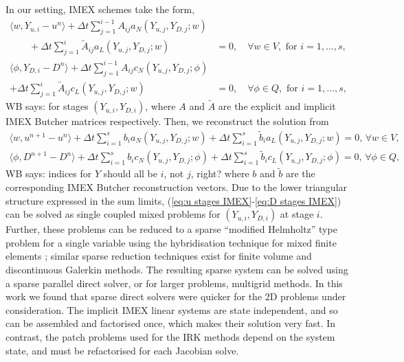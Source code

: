 \documentclass[a4paper, 12pt]{article}
\newcommand{\werner}[1]{{\color{magenta}WB says: #1}}
\begin{document}
In our setting, IMEX schemes take the form,
\begin{align}
    \nonumber
    \langle w, Y_{u,i}-u^n \rangle + \Delta t \sum_{j=1}^{i-1} A_{ij} a_N\left(
    Y_{u,j}, Y_{D,j}; w\right) & \\
\qquad    + \Delta t \sum_{j=1}^i \tilde{A}_{ij} a_L(Y_{u,j}, Y_{D,j}; w)
    & = 0, \label{eq:u stages IMEX}
  \quad \forall w \in V,\mbox{ for }i=1,\ldots,s, \\
  \nonumber
    \langle \phi, Y_{D,i}-D^n \rangle + \Delta t \sum_{j=1}^{i-1} A_{ij} c_N\left(
    Y_{u,j}, Y_{D,j}; \phi\right) & \\
    + \Delta t \sum_{j=1}^i \tilde{A}_{ij} c_L(Y_{u,j}, Y_{D,j}; w)
    & = 0, \label{eq:D stages IMEX}
      \quad \forall \phi \in Q,\mbox{ for }i=1,\ldots,s,
\end{align}
\werner{for stages $(Y_{u,i},Y_{D,i})$,}
where $A$ and $\tilde{A}$ are the explicit and implicit IMEX Butcher
matrices respectively. Then, we reconstruct the solution from
\begin{align}
  \langle w, u^{n+1} - u^n\rangle + \Delta t\sum_{i=1}^s b_i
  a_N(Y_{u,j}, Y_{D,j}; w)
  + \Delta t \sum_{i=1}^s \tilde{b}_i
  a_L(Y_{u,j}, Y_{D,j}; w)=0,\, \forall w \in V, \\
    \langle \phi, D^{n+1} - D^n\rangle + \Delta t\sum_{i=1}^s b_i
  c_N(Y_{u,j}, Y_{D,j}; \phi)
  + \Delta t \sum_{i=1}^s \tilde{b}_i
    c_L(Y_{u,j}, Y_{D,j}; \phi)=0,\, \forall \phi \in Q,
\end{align}
\werner{indices for $Y$ should all be $i$, not $j$, right?}
where $b$ and $\tilde{b}$ are the corresponding IMEX Butcher
reconstruction vectors. Due to the lower triangular structure
expressed in the sum limits, (\ref{eq:u stages IMEX}-\ref{eq:D stages
  IMEX}) can be solved as single coupled mixed problems for
$(Y_{u,i},Y_{D,i})$ at stage $i$. Further, these problems can be
reduced to a sparse ``modified Helmholtz'' type problem for a single
variable using the hybridisation technique for mixed finite elements
\citep{boffi2013mixed,cockburn2004characterization}; similar sparse
reduction techniques exist for finite volume and discontinuous
Galerkin methods. The resulting sparse system can be solved using a
sparse parallel direct solver, or for larger problems, multigrid
methods. In this work we found that sparse direct solvers were quicker
for the 2D problems under consideration. The implicit IMEX linear
systems are state independent, and so can be assembled and factorised
once, which makes their solution very fast. In contrast, the patch
problems used for the IRK methods depend on the system state, and must
be refactorised for each Jacobian solve.
\end{document}
